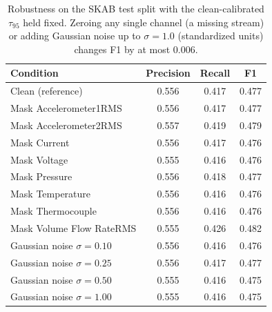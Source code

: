\begin{table}[H]
\centering
\caption{Robustness on the SKAB test split with the clean-calibrated $\tau_{95}$ held fixed. Zeroing any single channel (a missing stream) or adding Gaussian noise up to $\sigma=1.0$ (standardized units) changes F1 by at most $0.006$.}
\label{table:skab_robustness}
\setlength{\tabcolsep}{7pt}\small
\begin{tabular}{lccc}
\toprule
\textbf{Condition} & \textbf{Precision} & \textbf{Recall} & \textbf{F1} \\
\midrule
Clean (reference)            & 0.556 & 0.417 & 0.477 \\
\midrule
Mask Accelerometer1RMS       & 0.556 & 0.417 & 0.477 \\
Mask Accelerometer2RMS       & 0.557 & 0.419 & 0.479 \\
Mask Current                 & 0.556 & 0.417 & 0.476 \\
Mask Voltage                 & 0.555 & 0.416 & 0.476 \\
Mask Pressure                & 0.556 & 0.418 & 0.477 \\
Mask Temperature             & 0.556 & 0.416 & 0.476 \\
Mask Thermocouple            & 0.556 & 0.416 & 0.476 \\
Mask Volume Flow RateRMS     & 0.555 & 0.426 & 0.482 \\
\midrule
Gaussian noise $\sigma=0.10$ & 0.556 & 0.416 & 0.476 \\
Gaussian noise $\sigma=0.25$ & 0.556 & 0.417 & 0.477 \\
Gaussian noise $\sigma=0.50$ & 0.555 & 0.416 & 0.475 \\
Gaussian noise $\sigma=1.00$ & 0.555 & 0.416 & 0.475 \\
\bottomrule
\end{tabular}
\end{table}
